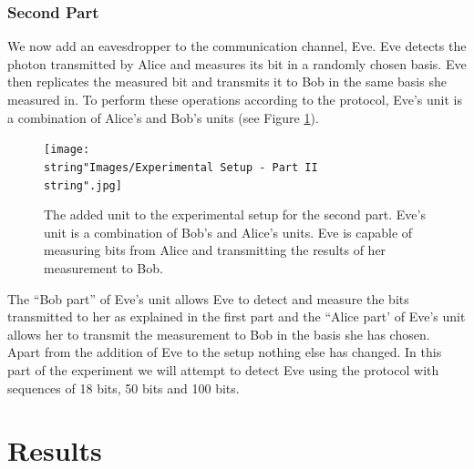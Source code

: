\documentclass[reprint,amsmath,amssymb,aps, prl,superscriptaddress]{revtex4-2}
\begin{document}
\section*{Second Part}
We now add an eavesdropper to the communication channel, Eve. Eve detects the photon transmitted by Alice and measures its bit in a randomly chosen basis. Eve then replicates the measured bit and transmits it to Bob in the same basis she measured in. To perform these operations according to the protocol, Eve's unit is a combination of Alice's and Bob's units (see Figure \ref{fig: Experimental Setup II }). 
\begin{figure}[H]
\texttt{[image: \\string"Images/Experimental Setup - Part II\\string".jpg]}

\caption{The added unit to the experimental setup for the second part. Eve's
unit is a combination of Bob's and Alice's units. Eve is capable of
measuring bits from Alice and transmitting the results of her measurement
to Bob. \label{fig: Experimental Setup II }}

\end{figure} 
The ``Bob part'' of Eve's unit allows Eve to detect and measure the bits transmitted to her as explained in the first part and the ``Alice part' of Eve's unit allows her to transmit the measurement to Bob in the basis she has chosen. Apart from the addition of Eve to the setup nothing else has changed. In this part of the experiment we will attempt to detect Eve using the protocol with sequences of 18 bits, 50 bits and 100 bits.

\part*{Results}
\end{document}
